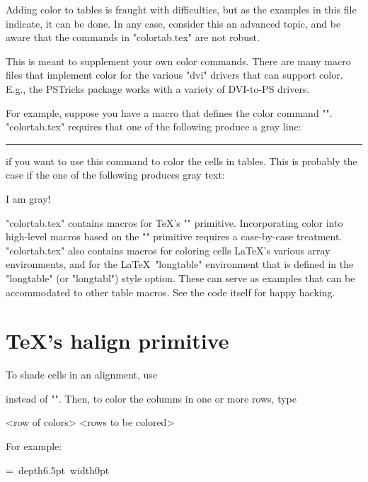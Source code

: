 Adding color to tables is fraught with difficulties, but as the examples in
this file indicate, it can be done. In any case, consider this an advanced
topic, and be aware that the commands in "colortab.tex" are not robust.

This is meant to supplement your own color commands. There are many macro
files that implement color for the various "dvi" drivers that can support
color. E.g., the PSTricks package works with a variety of DVI-to-PS drivers.

For example, suppose you have a macro that defines the color command "\gray".
"colortab.tex" requires that one of the following produce a gray line:
\begin{LVerbatim}
  {\gray \hrule}
  \gray{\hrule}
\end{LVerbatim}
if you want to use this command to color the cells in tables.
This is probably the case if the one of the following produces gray text:
\begin{LVerbatim}
  {\gray I am gray!}
\end{LVerbatim}

"colortab.tex" contains macros for \TeX's "\halign" primitive. Incorporating
color into high-level macros based on the "\halign" primitive requires a
case-by-case treatment. "colortab.tex" also contains macros for coloring cells
\LaTeX's various array environments, and for the \LaTeX\ "longtable"
environment that is defined in the "longtable" (or "longtabl") style option.
These can serve as examples that can be accommodated to other table macros.
See the code itself for happy hacking.

\section{\TeX's halign primitive}

To shade cells in an alignment, use
\begin{LVerbatim}
\end{LVerbatim}
instead of "\halign". Then,  to color the columns in one or more rows, type
\begin{LVerbatim}
  \CC
    <row of colors>\cr
    <rows to be colored>\cr
  \ECC
\end{LVerbatim}
For example:
\begin{example}
  \setbox\strutbox=\hbox{\vrule height11.5pt
    depth6.5pt width0pt}%
  \vbox{\offinterlineskip
    }
\end{example}

